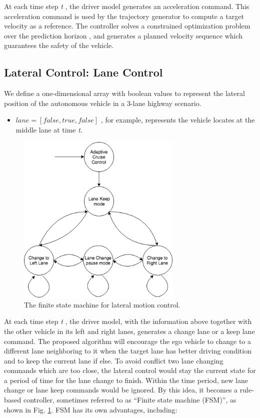 At each time step \textit{t} , the driver model generates an acceleration command. This acceleration command is used by the trajectory generator to compute a target velocity as a reference. The controller solves a constrained optimization problem over the prediction horizon , and generates a planned velocity sequence which guarantees the safety of the vehicle.

\subsection{Lateral Control: Lane Control}

We define a one-dimensional array with boolean values to represent the lateral position of the autonomous vehicle in a 3-lane highway scenario.

\begin{itemize}
\item $lane = [false, true, false]$ , for example, represents the vehicle locates at the middle lane at time \textit{t}.
\end{itemize}

\begin{figure}[h]
\centering
\includegraphics[width=0.7\textwidth]{figs/ch3/state-machine}
\caption{The finite state machine for lateral motion control.}
\label{fig:fsm}
\end{figure}

At each time step \textit{t} , the driver model, with the information above together with the other vehicle in its left and right lanes, generates a change lane or a keep lane command. The proposed algorithm will encourage the ego vehicle to change to a different lane neighboring to it when the target lane has better driving condition and to keep the current lane if else. To avoid conflict two lane changing commands which are too close, the lateral control would stay the current state for a period of time for the lane change to finish. Within the time period, new lane change or lane keep commands would be ignored. By this idea, it becomes a rule-based controller, sometimes referred to as ``Finite state machine (FSM)'', as shown in Fig. \ref{fig:fsm}. FSM has its own advantages, including:

